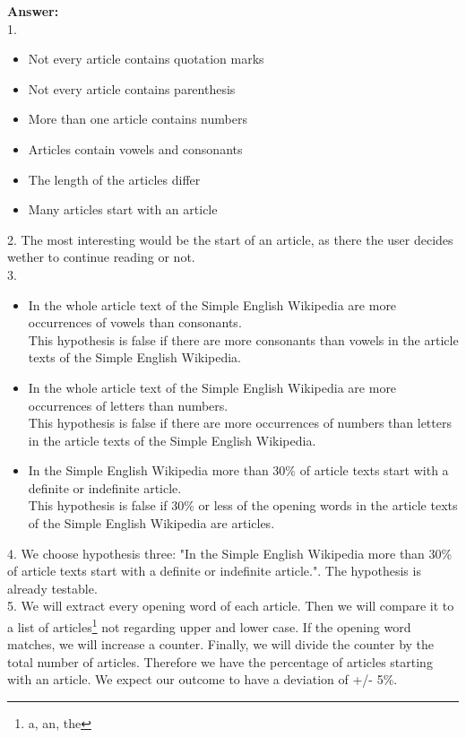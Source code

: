 \documentclass{WeSTassignment}
\begin{document}
\textbf{Answer:}
\\
1. 
\begin{itemize}
	\item Not every article contains quotation marks 
	\item Not every article contains parenthesis 
	\item More than one article contains numbers
	\item Articles contain vowels and consonants
	\item The length of the articles differ 
	\item Many articles start with an article
\end{itemize}
2.
The most interesting would be the start of an article, as there the user decides wether to continue reading or not.
\\3. 
\begin{itemize}
	\item In the whole article text of the Simple English Wikipedia are more occurrences of vowels than consonants. \\ This hypothesis is false if there are more consonants than vowels in the article texts of the Simple English Wikipedia.
	\item In the whole article text of the Simple English Wikipedia are more occurrences of letters than numbers. \\ This hypothesis is false if there are more occurrences of numbers than letters in the article texts of the Simple English Wikipedia.
	\item In the Simple English Wikipedia more than 30\% of article texts start with a definite or indefinite article. \\ This hypothesis is false if 30\% or less of the opening words in the article texts of the Simple English Wikipedia are articles. 
\end{itemize}
4. 
We choose hypothesis three: "In the Simple English Wikipedia more than 30\% of article texts start with a definite or indefinite article.". The hypothesis is already testable.\\
5.
We will extract every opening word of each article. Then we will compare it to a list of articles\footnote{a, an, the} not regarding upper and lower case. If the opening word matches, we will increase a counter. Finally, we will divide the counter by the total number of articles. Therefore we have the percentage of articles starting with an article. 
We expect our outcome to have a deviation of +/- 5\%.
\end{document}
